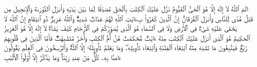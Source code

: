 الۤمۤ%
\stopbuffer%
\startbuffer[\q:3:2]
ٱللَّهُ لَاۤ إِلَٰهَ إِلَّا هُوَ ٱلۡحَیُّ ٱلۡقَیُّومُ%
\stopbuffer%
\startbuffer[\q:3:3]
نَزَّلَ عَلَیۡكَ ٱلۡكِتَٰبَ بِٱلۡحَقِّ مُصَدِّقࣰا لِّمَا بَیۡنَ یَدَیۡهِ وَأَنزَلَ ٱلتَّوۡرَىٰةَ وَٱلۡإِنجِیلَ%
\stopbuffer%
\startbuffer[\q:3:4]
مِن قَبۡلُ هُدࣰى لِّلنَّاسِ وَأَنزَلَ ٱلۡفُرۡقَانَۗ إِنَّ ٱلَّذِینَ كَفَرُوا۟ بِءَایَٰتِ ٱللَّهِ لَهُمۡ عَذَابࣱ شَدِیدࣱۗ وَٱللَّهُ عَزِیزࣱ ذُو ٱنتِقَامٍ%
\stopbuffer%
\startbuffer[\q:3:5]
إِنَّ ٱللَّهَ لَا یَخۡفَىٰ عَلَیۡهِ شَیۡءࣱ فِی ٱلۡأَرۡضِ وَلَا فِی ٱلسَّمَاۤءِ%
\stopbuffer%
\startbuffer[\q:3:6]
هُوَ ٱلَّذِی یُصَوِّرُكُمۡ فِی ٱلۡأَرۡحَامِ كَیۡفَ یَشَاۤءُۚ لَاۤ إِلَٰهَ إِلَّا هُوَ ٱلۡعَزِیزُ ٱلۡحَكِیمُ%
\stopbuffer%
\startbuffer[\q:3:7]
هُوَ ٱلَّذِیۤ أَنزَلَ عَلَیۡكَ ٱلۡكِتَٰبَ مِنۡهُ ءَایَٰتࣱ مُّحۡكَمَٰتٌ هُنَّ أُمُّ ٱلۡكِتَٰبِ وَأُخَرُ مُتَشَٰبِهَٰتࣱۖ فَأَمَّا ٱلَّذِینَ فِی قُلُوبِهِمۡ زَیۡغࣱ فَیَتَّبِعُونَ مَا تَشَٰبَهَ مِنۡهُ ٱبۡتِغَاۤءَ ٱلۡفِتۡنَةِ وَٱبۡتِغَاۤءَ تَأۡوِیلِهِۦۖ وَمَا یَعۡلَمُ تَأۡوِیلَهُۥۤ إِلَّا ٱللَّهُۗ وَٱلرَّٰسِخُونَ فِی ٱلۡعِلۡمِ یَقُولُونَ ءَامَنَّا بِهِۦ كُلࣱّ مِّنۡ عِندِ رَبِّنَاۗ وَمَا یَذَّكَّرُ إِلَّاۤ أُو۟لُوا۟ ٱلۡأَلۡبَٰبِ%
\stopbuffer%
